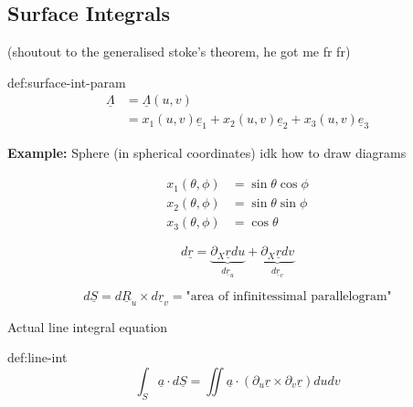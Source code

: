 \documentclass{article}
\begin{document}
\subsection{Surface Integrals}

(shoutout to the generalised stoke's theorem, he got me fr fr)

\begin{dfn}{def:surface-int-param}{}
    \begin{align*}
        \underline{\Lambda} &= \underline{\Lambda}(u,v)\\
                            &= x_{1}(u,v)\underline{e}_{1} + x_{2}(u,v)\underline{e}_{2} + x_{3}(u,v)\underline{e}_{3}
    \end{align*}
\end{dfn}

\textbf{Example:} Sphere (in spherical coordinates) idk how to draw diagrams

\begin{align*}
    x_{1}(\theta, \phi) &= \sin\theta\cos\phi\\
    x_{2}(\theta, \phi) &= \sin\theta\sin\phi\\
    x_{3}(\theta, \phi) &= \cos\theta
\end{align*}

\[d\underline{r} = \underbrace{\partial_{X}\underline{r} du}_{d\underline{r}_{u}} + \underbrace{\partial_{X}\underline{r} dv}_{d\underline{r}_{v}}\]

\[d\underline{S} = d\underline{R}_{u} \times d\underline{r}_{v} = \text{"area of infinitessimal parallelogram"}\]

Actual line integral equation
\begin{dfn}{def:line-int}{}
    \[\int_{S} \underline{a} \cdot d \underline{S} = \iint \underline{a} \cdot (\partial_{u}\underline{r} \times \partial_{v}\underline{r})du dv\]
\end{dfn}
\end{document}

